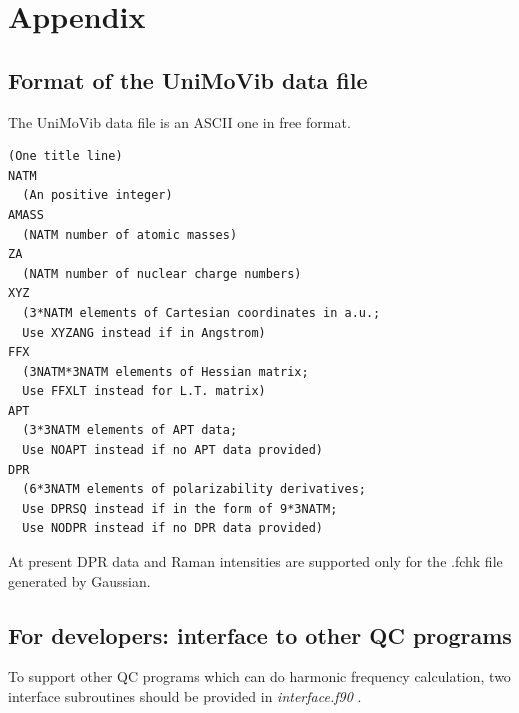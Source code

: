 \documentclass[12pt,english]{extarticle}
\begin{document}
\pagebreak{}

\appendix
\section{Appendix} \label{part:appdx}

\subsection{Format of the UniMoVib data file} \label{sec:almfmt}

The UniMoVib data file is an ASCII one in free format.
\begin{Verbatim}[frame=single,label=Format(Ver.1.0.1 2017.10.15),labelposition=topline,rulecolor=\color{green},fontsize=\small,baselinestretch=1.0]
(One title line)
NATM
  (An positive integer)
AMASS
  (NATM number of atomic masses)
ZA
  (NATM number of nuclear charge numbers)
XYZ
  (3*NATM elements of Cartesian coordinates in a.u.;
  Use XYZANG instead if in Angstrom)
FFX
  (3NATM*3NATM elements of Hessian matrix;
  Use FFXLT instead for L.T. matrix)
APT
  (3*3NATM elements of APT data;
  Use NOAPT instead if no APT data provided)
DPR
  (6*3NATM elements of polarizability derivatives;
  Use DPRSQ instead if in the form of 9*3NATM;
  Use NODPR instead if no DPR data provided)
\end{Verbatim}
At present DPR data and Raman intensities are supported only for the .fchk file generated by Gaussian.

\pagebreak{}

\subsection{For developers: interface to other QC programs} \label{sec:interface}

To support other QC programs which can do harmonic frequency calculation, two interface subroutines should be provided in \emph{interface.f90} .
\end{document}
